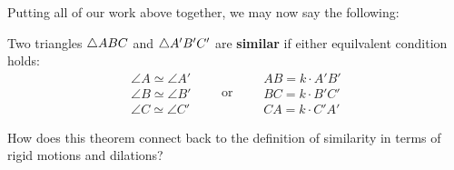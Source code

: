 Putting all of our work above together, we may now say the following:





\begin{theorem} 
Two triangles $\triangle ABC$ and $\triangle A'B'C'$ are 
\textbf{similar} if either equilvalent condition holds:
\[
\begin{array}{l}
\angle A \simeq \angle A'\\
\angle B \simeq \angle B' \\
\angle C \simeq \angle C'
\end{array}
\qquad\text{or}\qquad
\begin{array}{l}
AB = k\cdot A'B'\\
BC = k\cdot B'C' \\
CA = k\cdot C'A'
\end{array}
\]
\end{theorem}

\begin{question}
How does this theorem connect back to the definition of similarity in terms of rigid motions and dilations? 
\end{question}
\QM



%
%
%
%
%

%
%
%


